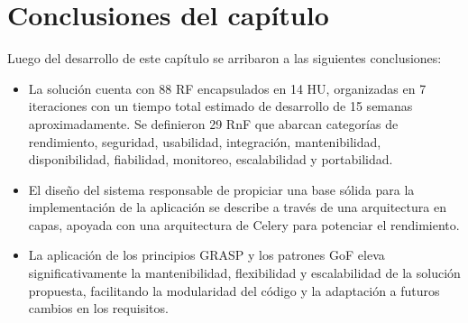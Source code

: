 \section{Conclusiones del capítulo}

Luego del desarrollo de este capítulo se arribaron a las siguientes conclusiones:

\begin{itemize}
	\item La solución cuenta con 88 \ac{RF} encapsulados en 14 \ac{HU}, organizadas en 7 iteraciones 
	con un tiempo total estimado de desarrollo de 15 semanas aproximadamente. Se definieron 29
	\ac{RnF} que abarcan categorías de rendimiento, seguridad, usabilidad, integración,
	mantenibilidad, disponibilidad, fiabilidad, monitoreo, escalabilidad y portabilidad.
	\item El diseño del sistema responsable de propiciar una base sólida para la implementación de la aplicación 
	se describe a través de una arquitectura en capas, apoyada con una arquitectura de Celery para potenciar 
	el rendimiento.
	\item La aplicación de los principios \ac{GRASP} y los patrones \ac{GoF} eleva significativamente
	la mantenibilidad, flexibilidad y escalabilidad de la solución propuesta, facilitando la modularidad del
	código y la adaptación a futuros cambios en los requisitos.
\end{itemize} 

